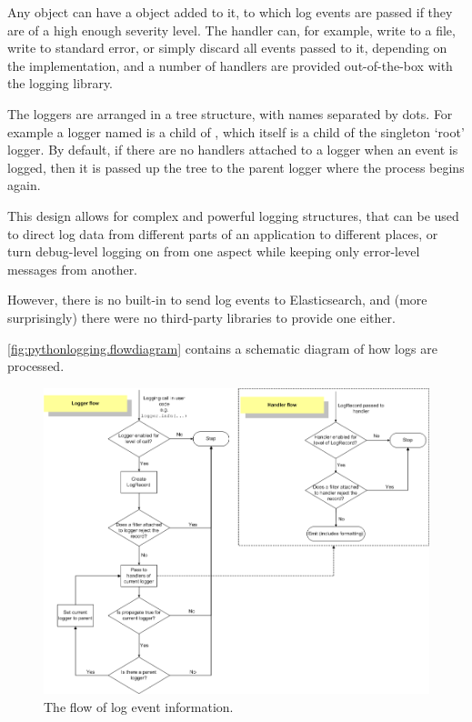 \documentclass[a4paper,11pt]{article} %
\begin{document}
Any  object can have a  object added to it,
to which log events are passed if they are of a high enough severity level.
The handler can, for example, write to a file, write to standard error, or
simply discard all events passed to it, depending on the implementation, and a
number of handlers are provided out-of-the-box with the logging library.

The loggers are arranged in a tree structure, with names separated by dots.
For example a logger named  is a child of ,
which itself is a child of the singleton `root' logger.  By default, if there
are no handlers attached to a logger when an event is logged, then it is passed
up the tree to the parent logger where the process begins again.

This design allows for complex and powerful logging structures, that can be
used to direct log data from different parts of an application to different
places, or turn debug-level logging on from one aspect while keeping only
error-level messages from another.

However, there is no built-in  to send log events to
Elasticsearch, and (more surprisingly) there were no third-party libraries to
provide one either.

\autoref{fig:pythonlogging.flowdiagram} contains a schematic diagram of how
logs are processed.

\begin{figure}[h]\centering
  \includegraphics[width=\textwidth]{logging_flow}
  \caption{The flow of log event information.\protect\footnotemark}
\label{fig:pythonlogging.flowdiagram}
\end{figure}
\end{document}

